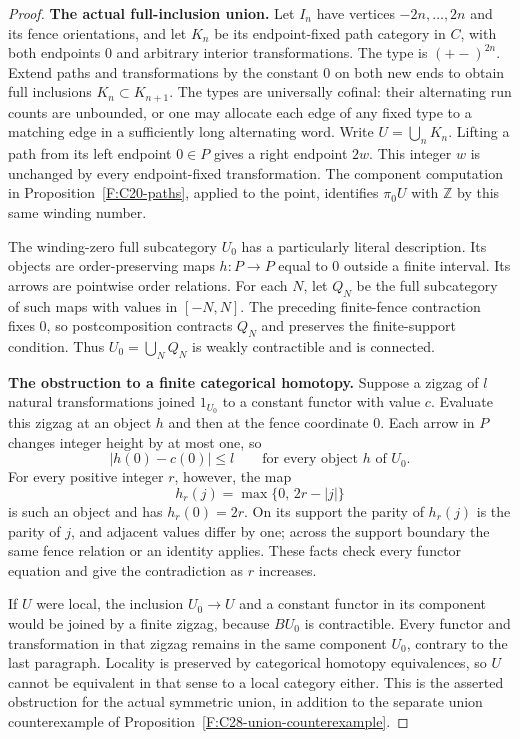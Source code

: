 \begin{proof}
\textbf{The actual full-inclusion union.}
Let $I_n$ have vertices $-2n,\ldots,2n$ and its fence orientations,
and let $K_n$ be its endpoint-fixed path category in $C$, with both
endpoints $0$ and arbitrary interior transformations. The type is
$(+-)^{2n}$. Extend paths and transformations by the constant $0$
on both new ends to obtain full inclusions $K_n\subset K_{n+1}$.
The types are universally cofinal: their alternating run counts
are unbounded, or one may allocate each edge of any fixed type to
a matching edge in a sufficiently long alternating word.
Write $U=\bigcup_n K_n$. Lifting a path from its left endpoint
$0\in P$ gives a right endpoint $2w$. This integer $w$ is unchanged
by every endpoint-fixed transformation. The component computation
in Proposition~\ref{F:C20-paths}, applied to the point, identifies
$\pi_0U$ with $\mathbb Z$ by this same winding number.

The winding-zero full subcategory $U_0$ has a particularly literal
description. Its objects are order-preserving maps $h:P\to P$
equal to $0$ outside a finite interval. Its arrows are pointwise
order relations. For each $N$, let $Q_N$ be the full subcategory
of such maps with values in $[-N,N]$. The preceding finite-fence
contraction fixes $0$, so postcomposition contracts $Q_N$ and
preserves the finite-support condition. Thus
$U_0=\bigcup_NQ_N$ is weakly contractible and is connected.

\textbf{The obstruction to a finite categorical homotopy.}
Suppose a zigzag of $l$ natural transformations joined $1_{U_0}$
to a constant functor with value $c$. Evaluate this zigzag at an
object $h$ and then at the fence coordinate $0$. Each arrow in
$P$ changes integer height by at most one, so
\[
 |h(0)-c(0)|\le l
 \qquad\text{for every object }h\text{ of }U_0.
\]
For every positive integer $r$, however, the map
\[
 h_r(j)=\max\{0,\,2r-|j|\}
\]
is such an object and has $h_r(0)=2r$. On its support the parity
of $h_r(j)$ is the parity of $j$, and adjacent values differ by
one; across the support boundary the same fence relation or an
identity applies. These facts check every functor equation and
give the contradiction as $r$ increases.

If $U$ were local, the inclusion $U_0\to U$ and a constant functor
in its component would be joined by a finite zigzag, because
$BU_0$ is contractible. Every functor and transformation in that
zigzag remains in the same component $U_0$, contrary to the last
paragraph. Locality is preserved by categorical homotopy
equivalences, so $U$ cannot be equivalent in that sense to a local
category either. This is the asserted obstruction for the actual
symmetric union, in addition to the separate union counterexample
of Proposition~\ref{F:C28-union-counterexample}.


\end{proof}
